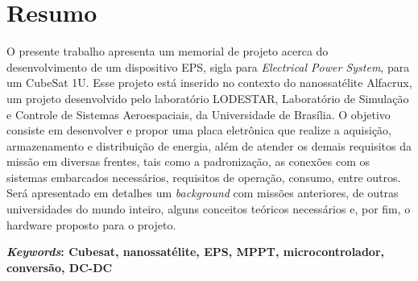 \chapter*{Resumo}
O presente trabalho apresenta um memorial de projeto acerca do desenvolvimento de um dispositivo EPS, sigla para \textit{Electrical Power System}, para um CubeSat 1U. Esse projeto está inserido no contexto do nanossatélite Alfacrux, um projeto desenvolvido pelo laboratório LODESTAR, Laboratório de Simulação e Controle de Sistemas Aeroespaciais, da Universidade de Brasília. O objetivo consiste em desenvolver e propor uma placa eletrônica que realize a aquisição, armazenamento e distribuição de energia, além de atender os demais requisitos da missão em diversas frentes, tais como a padronização, as conexões com os sistemas embarcados necessários, requisitos de operação, consumo, entre outros. Será apresentado em detalhes um \textit{background} com missões anteriores, de outras universidades do mundo inteiro, alguns conceitos teóricos necessários e, por fim, o hardware proposto para o projeto.

\textbf{\textit{Keywords}: Cubesat, nanossatélite, EPS, MPPT, microcontrolador, conversão, DC-DC}